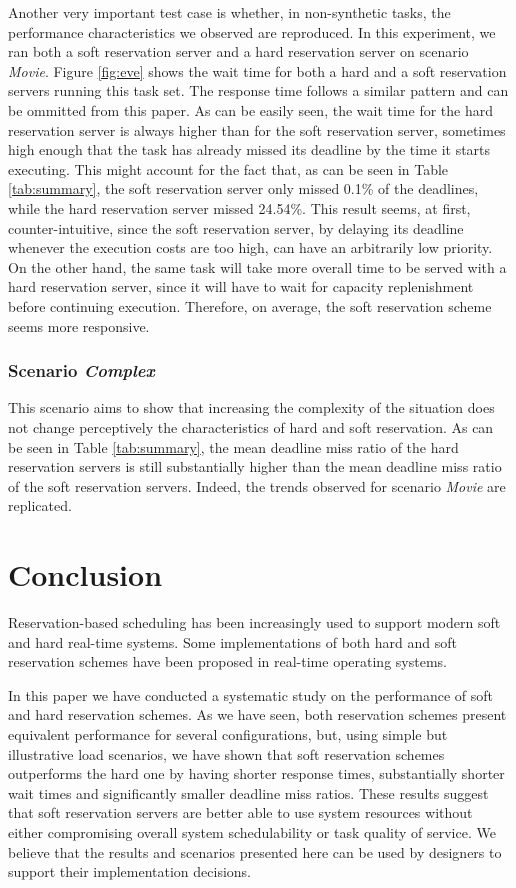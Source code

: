 \documentclass[12pt]{article}
\newcommand{\Lquatro}{\textit{Movie}}
\newcommand{\Lcinco}{\textit{Complex}}
\begin{document}
Another very important test case is whether, in non-synthetic tasks,
the performance characteristics we observed are reproduced. In this
experiment, we ran both a soft reservation server and a hard
reservation server on scenario \Lquatro{}. Figure \ref{fig:eve} shows the wait
time for both a hard and a soft reservation servers running this task
set. The response time follows a similar pattern and can be ommitted
from this paper. As can be easily seen, the wait time for the hard
reservation server is always higher than for the soft reservation
server, sometimes high enough that the task has already missed its
deadline by the time it starts executing. This might account for the
fact that, as can be seen in Table \ref{tab:summary}, the soft
reservation server only missed 0.1\% of the deadlines, while the hard
reservation server missed 24.54\%. This result seems, at first,
counter-intuitive, since the soft reservation server, by delaying its
deadline whenever the execution costs are too high, can have an
arbitrarily low priority. On the other hand, the same task will take
more overall time to be served with a hard reservation server, since
it will have to wait for capacity replenishment before continuing
execution. Therefore, on average, the soft reservation scheme seems
more responsive.

\subsubsection{Scenario \Lcinco{}}
\label{sec:scenario-l5}

This scenario aims to show that increasing the complexity of the
situation does not change perceptively the characteristics of hard and
soft reservation. As can be seen in Table \ref{tab:summary}, the mean
deadline miss ratio of the hard reservation servers is still
substantially higher than the mean deadline miss ratio of the soft
reservation servers. Indeed, the trends observed for scenario \Lquatro{} are
replicated.

\section{Conclusion}
\label{sec:conclusion}

Reservation-based scheduling has been increasingly used to support
modern soft and hard real-time systems. Some implementations of both
hard and soft reservation schemes have been proposed in real-time
operating systems.

In this paper we have conducted a systematic study on the performance
of soft and hard reservation schemes. As we have seen, both
reservation schemes present equivalent performance for several
configurations, but, using simple but illustrative load scenarios, we
have shown that soft reservation schemes outperforms the hard one by
having shorter response times, substantially shorter wait times and
significantly smaller deadline miss ratios. These results suggest that
soft reservation servers are better able to use system resources
without either compromising overall system schedulability or task
quality of service. We believe that the results and scenarios
presented here can be used by designers to support their
implementation decisions.



\end{document}

